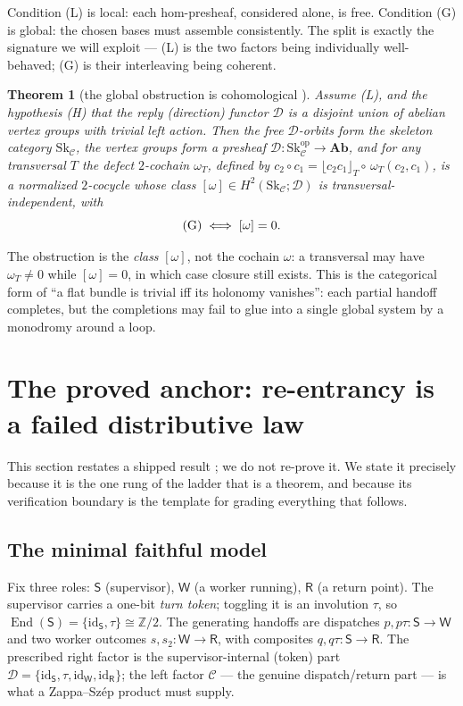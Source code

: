 \documentclass[11pt]{amsart}
\newtheorem{theorem}{Theorem}[section]
\theoremstyle{definition}
\theoremstyle{remark}
\newcommand{\End}{\operatorname{End}}
\newcommand{\id}{\mathrm{id}}
\newcommand{\C}{\mathcal{C}}
\newcommand{\D}{\mathcal{D}}
\newcommand{\Sk}{\mathrm{Sk}}
\newcommand{\Sup}{\mathsf{S}}
\newcommand{\Wk}{\mathsf{W}}
\newcommand{\Rt}{\mathsf{R}}
\newcommand{\dir}{\mathcal{D}}
\begin{document}
Condition (L) is local: each hom-presheaf, considered alone, is free. Condition (G) is global: the
chosen bases must assemble consistently. The split is exactly the signature we will exploit --- (L)
is the two factors being individually well-behaved; (G) is their interleaving being coherent.

\begin{theorem}[the global obstruction is cohomological \cite{gobstr,baueswirsching}]\label{thm:gobstr}
Assume \textnormal{(L)}, and the hypothesis \textnormal{(H)} that the reply (direction) functor
$\dir$ is a disjoint union of \emph{abelian} vertex groups with trivial left action. Then the free
$\D$-orbits form the \emph{skeleton category} $\Sk_\C$, the vertex groups form a presheaf
$\dir:\Sk_\C^{\mathrm{op}}\to\mathbf{Ab}$, and for any transversal $T$ the \emph{defect $2$-cochain}
$\omega_T$, defined by $c_2\circ c_1=\lfloor c_2c_1\rfloor_T\circ\,\omega_T(c_2,c_1)$, is a
normalized $2$-cocycle whose class $[\omega]\in H^2(\Sk_\C;\dir)$ is transversal-independent, with
\[
  \textnormal{(G)}\iff [\omega]=0 .
\]
\end{theorem}

The obstruction is the \emph{class} $[\omega]$, not the cochain $\omega$: a transversal may have
$\omega_T\neq 0$ while $[\omega]=0$, in which case closure still exists. This is the categorical form
of ``a flat bundle is trivial iff its holonomy vanishes'': each partial handoff completes, but the
completions may fail to glue into a single global system by a monodromy around a loop.

\section{The proved anchor: re-entrancy is a failed distributive law}\label{sec:anchor}

This section restates a shipped result \cite{analytic,leanfile}; we do not re-prove it. We state it
precisely because it is the one rung of the ladder that is a theorem, and because its verification
boundary is the template for grading everything that follows.

\subsection*{The minimal faithful model}
Fix three roles: $\Sup$ (supervisor), $\Wk$ (a worker running), $\Rt$ (a return point). The
supervisor carries a one-bit \emph{turn token}; toggling it is an involution $\tau$, so
$\End(\Sup)=\{\id_\Sup,\tau\}\cong\mathbb Z/2$. The generating handoffs are dispatches
$p,p\tau:\Sup\to\Wk$ and two worker outcomes $s,s_2:\Wk\to\Rt$, with composites $q,q\tau:\Sup\to\Rt$.
The prescribed right factor is the supervisor-internal (token) part
$\D=\{\id_\Sup,\tau,\id_\Wk,\id_\Rt\}$; the left factor $\C$ --- the genuine dispatch/return part ---
is what a Zappa--Sz\'ep product must supply.
\end{document}
